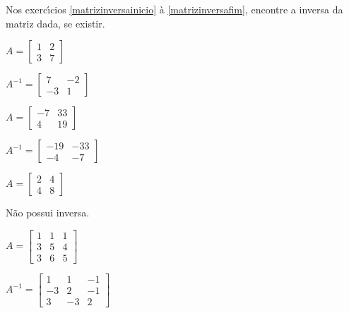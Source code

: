 \documentclass[12pt]{exam}
\begin{document}
Nos exerc{\'\i}cios \ref{matrizinversainicio} \`a \ref{matrizinversafim}, encontre a inversa da matriz dada, se existir.

\begin{exercicio}\label{matrizinversainicio}
  $
    A =\begin{bmatrix}
        1 & 2\\
        3 & 7
    \end{bmatrix}
  $
  \begin{solucao}
    $A^{-1} =\begin{bmatrix}
      7 & -2\\
      -3 & 1
    \end{bmatrix}$
  \end{solucao}
\end{exercicio}

\begin{exercicio}
  $
    A =\begin{bmatrix}
        -7 & 33\\
        4 & 19
    \end{bmatrix}
  $
  \begin{solucao}
    $A^{-1} =\begin{bmatrix}
      -19 & -33\\
      -4 & -7
    \end{bmatrix}$
  \end{solucao}
\end{exercicio}

\begin{exercicio}
  $
    A =\begin{bmatrix}
        2 & 4\\
        4 & 8
    \end{bmatrix}
  $
  \begin{solucao}
    N\~ao possui inversa.
  \end{solucao}
\end{exercicio}

\begin{exercicio}
  $
    A =\begin{bmatrix}
        1 & 1 & 1\\
        3 & 5 & 4\\
        3 & 6 & 5
      \end{bmatrix}
    $
  \begin{solucao}
    $
      A^{-1} =\begin{bmatrix}
        1 & 1 & -1\\
        -3 & 2 & -1\\
        3 & -3 & 2
      \end{bmatrix}
    $
  \end{solucao}
\end{exercicio}
\end{document}
